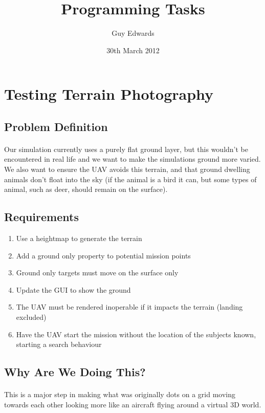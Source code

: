 \documentclass[11pt]{book}
\title{\textbf{Programming Tasks}}
\author{Guy Edwards}
\date{30th March 2012}
\begin{document}
\section{Testing Terrain Photography}

\subsection{Problem Definition}

\paragraph{} Our simulation currently uses a purely flat ground layer, but this wouldn't be encountered in real life and we want to make the simulations ground more varied. We also want to ensure the UAV avoids this terrain, and that ground dwelling animals don't float into the sky (if the animal is a bird it can, but some types of animal, such as deer, should remain on the surface).

\subsection{Requirements}

\begin{enumerate}
\item Use a heightmap to generate the terrain
\item Add a ground only property to potential mission points
\item Ground only targets must move on the surface only
\item Update the GUI to show the ground
\item The UAV must be rendered inoperable if it impacts the terrain (landing excluded)
\item Have the UAV start the mission without the location of the subjects known, starting a search behaviour
\end{enumerate}

\subsection{Why Are We Doing This?}

\paragraph{} This is a major step in making what was originally dots on a grid moving towards each other looking more like an aircraft flying around a virtual 3D world.
\end{document}
